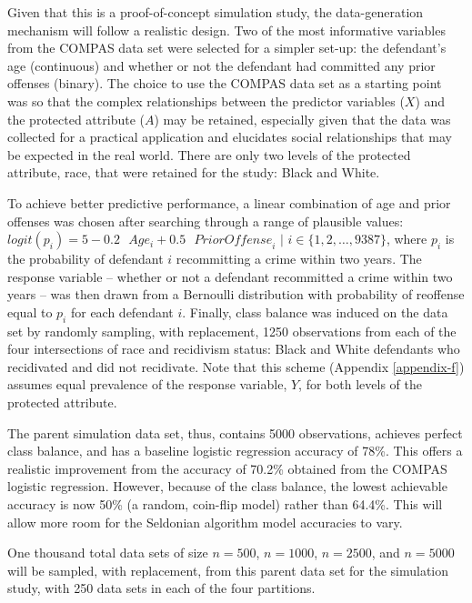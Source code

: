 \documentclass[12pt, twoside]{amherstthesis}
\begin{document}
Given that this is a proof-of-concept simulation study, the data-generation mechanism will follow a realistic design. Two of the most informative variables from the COMPAS data set were selected for a simpler set-up: the defendant's age (continuous) and whether or not the defendant had committed any prior offenses (binary). The choice to use the COMPAS data set as a starting point was so that the complex relationships between the predictor variables (\(X\)) and the protected attribute (\(A\)) may be retained, especially given that the data was collected for a practical application and elucidates social relationships that may be expected in the real world. There are only two levels of the protected attribute, race, that were retained for the study: Black and White.

To achieve better predictive performance, a linear combination of age and prior offenses was chosen after searching through a range of plausible values: \(logit(p_i) = 5 - 0.2 \text{ }Age_i + 0.5 \text{ } \textit{PriorOffense}_i \text{ | } i \in \{1,2, \ldots, 9387\}\), where \(p_i\) is the probability of defendant \(\textit{i}\) recommitting a crime within two years. The response variable -- whether or not a defendant recommitted a crime within two years -- was then drawn from a Bernoulli distribution with probability of reoffense equal to \(p_i\) for each defendant \(\textit{i}\). Finally, class balance was induced on the data set by randomly sampling, with replacement, 1250 observations from each of the four intersections of race and recidivism status: Black and White defendants who recidivated and did not recidivate. Note that this scheme (Appendix \ref{appendix-f}) assumes equal prevalence of the response variable, \(Y\), for both levels of the protected attribute.

The parent simulation data set, thus, contains 5000 observations, achieves perfect class balance, and has a baseline logistic regression accuracy of 78\%. This offers a realistic improvement from the accuracy of 70.2\% obtained from the COMPAS logistic regression. However, because of the class balance, the lowest achievable accuracy is now 50\% (a random, coin-flip model) rather than 64.4\%. This will allow more room for the Seldonian algorithm model accuracies to vary.

One thousand total data sets of size \(n = 500\), \(n = 1000\), \(n = 2500\), and \(n = 5000\) will be sampled, with replacement, from this parent data set for the simulation study, with 250 data sets in each of the four partitions.
\end{document}
